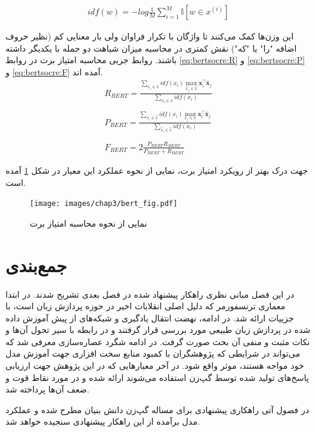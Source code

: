 \begin{align} \label{eq:idf}
idf(w) = -log \frac{1}{M} \sum_{i=1}^{M} \mathbb{I}[w \in x^{(i)}]
\end{align}

 این وزن‌ها کمک می‌کنند تا واژگان با تکرار فراوان ولی بار معنایی کم (نظیر حروف اضافه "را" یا "که") نقش کمتری در محاسبه میزان شباهت دو جمله با یکدیگر داشته باشند. روابط جزیی محاسبه امتیاز برت در روابط 
\ref{eq:bertsocre:R}
و
\ref{eq:bertsocre:P}
و
\ref{eq:bertsocre:F}
آمده اند.
\begin{align}\label{eq:bertsocre:R}
R_{BERT} = \frac{
\sum_{x_i \in x}^{} idf(x_i) \max_{\hat{x}_j \in \hat{x} } \mathbf{x}_i^\intercal \mathbf{\hat{x}}_j
}
{\sum_{x_i \in x}^{} idf(x_i) } \\ \nonumber \\ \label{eq:bertsocre:P} 
P_{BERT} = \frac{
	\sum_{x_i \in \hat{x}}^{} idf(x_i) \max_{x_j \in x } \mathbf{x}_i^\intercal \mathbf{\hat{x}}_j
}
{\sum_{\hat{x}_i \in \hat{x}}^{} idf(x_i) } \\ \nonumber \\ \label{eq:bertsocre:F} 
F_{BERT} = 2 \frac{P_{BERT} \dot{R_{BERT}}}{P_{BERT}+R_{BERT}}
\end{align}

جهت درک بهتر از رویکرد امتیاز برت، نمایی از نحوه عملکرد این معیار در شکل 
\ref{fig:chap3:bertscore}
آمده است.

 \begin{figure}[h]
	\centering
	\texttt{[image: images/chap3/bert\_fig.pdf]}
	\caption[نمایی از نحوه محاسبه امتیاز برت]
	{
		نمایی از نحوه محاسبه امتیاز برت
		\cite{bertscore_paper}
	}
	\label{fig:chap3:bertscore}
\end{figure}

\section{جمع‌بندی}
در این فصل مبانی نظری راهکار پیشنهاد شده در فصل بعدی تشریح شدند. در ابتدا معماری ترنسفورمر که دلیل اصلی انقلابات اخیر در حوزه پردازش زبان است، با جزییات ارائه شد. در ادامه، نهضت انتقال یادگیری و شبکه‌های از پیش آموزش داده شده در پردازش زبان طبیعی مورد بررسی قرار گرفتند و در رابطه با سیر تحول آن‌ها و نکات مثبت و منفی آن بحث صورت گرفت. در ادامه شگرد عصاره‌سازی معرفی شد که می‌تواند در شرایطی که پژوهشگران با کمبود منابع سخت افزاری جهت آموزش مدل خود مواجه هستند، موثر واقع شود. در آخر معیارهایی که در این پژوهش جهت ارزیابی پاسخ‌های تولید شده توسط گپ‌زن استفاده می‌شوند ارائه شده و در مورد نقاط قوت و ضعف آن‌ها پرداخته شد.

در فصول آتی راهکاری پیشنهادی برای مساله گپ‌زن دانش بنیان مطرح شده و عملکرد مدل برآمده از این راهکار پیشنهادی سنجیده خواهد شد.